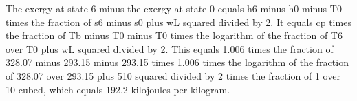 The exergy at state 6 minus the exergy at state 0 equals h6 minus h0 minus T0 times the fraction of s6 minus s0 plus wL squared divided by 2. It equals cp times the fraction of Tb minus T0 minus T0 times the logarithm of the fraction of T6 over T0 plus wL squared divided by 2. This equals 1.006 times the fraction of 328.07 minus 293.15 minus 293.15 times 1.006 times the logarithm of the fraction of 328.07 over 293.15 plus 510 squared divided by 2 times the fraction of 1 over 10 cubed, which equals 192.2 kilojoules per kilogram.